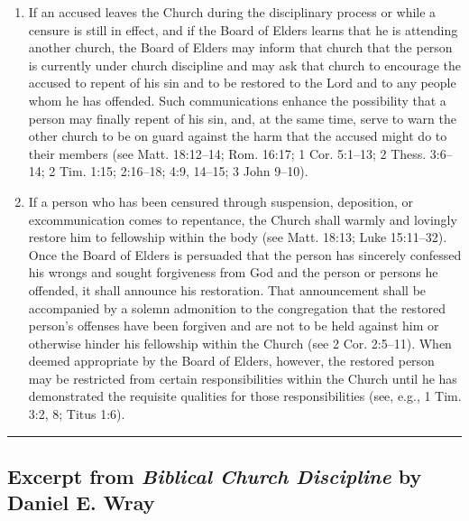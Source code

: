 \documentclass[
]{book}
\begin{document}
\begin{enumerate}
\item
  If an accused leaves the Church during the disciplinary process or while a censure is still in effect, and if the Board of Elders learns that he is attending another church, the Board of Elders may inform that church that the person is currently under church discipline and may ask that church to encourage the accused to repent of his sin and to be restored to the Lord and to any people whom he has offended. Such communications enhance the possibility that a person may finally repent of his sin, and, at the same time, serve to warn the other church to be on guard against the harm that the accused might do to their members (see Matt. 18:12--14; Rom. 16:17; 1 Cor. 5:1--13; 2 Thess. 3:6--14; 2 Tim. 1:15; 2:16--18; 4:9, 14--15; 3 John 9--10).
\item
  If a person who has been censured through suspension, deposition, or excommunication comes to repentance, the Church shall warmly and lovingly restore him to fellowship within the body (see Matt. 18:13; Luke 15:11--32). Once the Board of Elders is persuaded that the person has sincerely confessed his wrongs and sought forgiveness from God and the person or persons he offended, it shall announce his restoration. That announcement shall be accompanied by a solemn admonition to the congregation that the restored person's offenses have been forgiven and are not to be held against him or otherwise hinder his fellowship within the Church (see 2 Cor. 2:5--11). When deemed appropriate by the Board of Elders, however, the restored person may be restricted from certain responsibilities within the Church until he has demonstrated the requisite qualities for those responsibilities (see, e.g., 1 Tim. 3:2, 8; Titus 1:6).
\end{enumerate}

\begin{center}\rule{0.5\linewidth}{0.5pt}\end{center}

\hypertarget{excerpt-from-biblical-church-discipline-by-daniel-e.-wray}{%
\subsection{\texorpdfstring{Excerpt from \emph{Biblical Church Discipline} by Daniel E. Wray}{Excerpt from Biblical Church Discipline by Daniel E. Wray}}\label{excerpt-from-biblical-church-discipline-by-daniel-e.-wray}}
\end{document}

